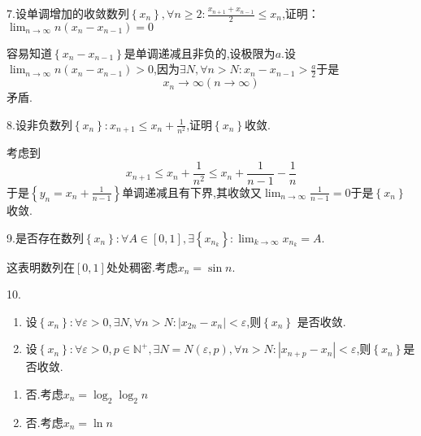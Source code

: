 7.设单调增加的收敛数列$\left\{x_n\right\},\forall n\geqslant 2:\displaystyle\frac{x_{n+1}+x_{n-1}}{2}\leqslant x_{n}$,证明：$\displaystyle\lim_{n\to\infty}n\left(x_n-x_{n-1}\right)=0$
\begin{Proof}
    容易知道$\left\{x_n-x_{n-1}\right\}$是单调递减且非负的,设极限为$a$.设$\displaystyle\lim_{n\to\infty}n\left(x_{n}-x_{n-1}\right)>0$,因为$\exists N,\forall n>N:\displaystyle x_n-x_{n-1}>\frac{a}{2}$于是\[
    x_n\to\infty\left(
        n\to\infty
    \right)
    \]矛盾.
\end{Proof}

8.设非负数列$\displaystyle\left\{x_n\right\}:x_{n+1}\leqslant x_n+\frac{1}{n^2}$,证明$\left\{x_n\right\}$收敛.
\begin{Proof}
    考虑到\[
    x_{n+1}\leqslant x_n+\frac{1}{n^2}\leqslant x_n+\frac{1}{n-1}-\frac{1}{n}
    \]于是$\displaystyle\left\{y_n=x_n+\frac{1}{n-1}\right\}$单调递减且有下界,其收敛又$\displaystyle\lim_{n\to\infty}\frac{1}{n-1}=0$于是$\displaystyle\left\{x_n\right\}$收敛.
\end{Proof}

9.是否存在数列$\left\{x_n\right\}:\forall A\in\left[0,1\right],\exists\left\{x_{n_k}\right\}:\lim_{k\to\infty}x_{n_k}=A$.
\begin{Proof}
    这表明数列在$\left[0,1\right]$处处稠密.考虑$x_n=\sin n$.
\end{Proof}

10.\begin{enumerate}[label={\textup{(\arabic*)}}]
    \item 设$\displaystyle\left\{x_n\right\}:\forall \varepsilon>0,\exists N,\forall n>N:\left|x_{2n}-x_n\right|<\varepsilon$,则$\left\{x_n\right\}$ 是否收敛.
    \item 设$\displaystyle\left\{x_n\right\}:\forall\varepsilon>0,p\in\mathbb{N}^+,\exists N=N\left(\varepsilon,p\right),\forall n>N:\left|x_{n+p}-x_n\right|<\varepsilon$,则$\left\{x_n\right\}$是否收敛.
\end{enumerate}
\begin{solution}
    \begin{enumerate}[label={\textup{(\arabic*)}}]
        \item 否.考虑$\displaystyle x_n=\log_2\log_2 n$
        \item 否.考虑$\displaystyle x_n=\ln n$
    \end{enumerate}
\end{solution}

